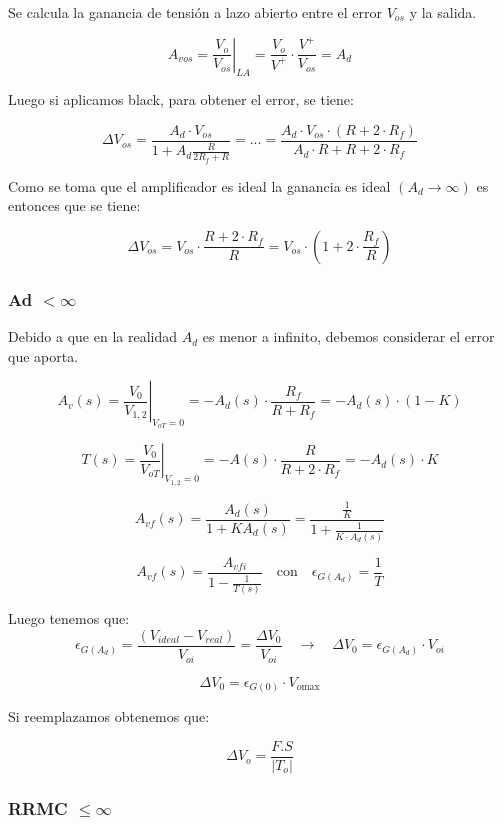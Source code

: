 Se calcula la ganancia de tensión a lazo abierto entre el error $V_{os}$ y la salida.

\[
A_{vos} = \left.\frac{V_{o}}{V_{o s}}\right|_{LA} = 
\frac{V_{o}}{V^{+}} \cdot \frac{V^{+}}{V_{os}} = A_d
\]

Luego si aplicamos black, para obtener el error, se tiene:
 
\[
\Delta V_{os} = \frac{A_d \cdot V_{os}}{1+A_d \frac{R}{2 R_f+R}} = ... 
 = \frac{A_d \cdot V_{os} \cdot (R + 2 \cdot R_f)}{A_d \cdot R + R + 2 \cdot R_f}
\]
 

Como se toma que el amplificador es ideal la ganancia es ideal $\left(A_{d} \rightarrow \infty\right)$ es entonces que se tiene:

\[
\Delta V_{os}  = V_{os} \cdot \frac {R + 2 \cdot R_f}{R} 
=  V_{os} \cdot (1 + 2 \cdot \frac {R_f}{R} )
\]
 
\subsubsection{Ad $ <  \infty $}

Debido a que en la realidad $A_d$ es menor a infinito, debemos considerar el error que aporta.

\[ A_v(s) = \left.\frac{V_0}{V_{1,2}}\right|_{V_{oT} = 0}  = -A_d(s) \cdot \frac{R_f}{R + R_f} = -A_d(s) \cdot (1 - K) \]

\[ T(s) = \left.\frac{V_0}{V_{oT}}\right|_{V_{1,2} = 0} = -A(s) \cdot  \frac{R}{R + 2\cdot R_f}= - A_d(s) \cdot K \]

\[ A_{vf}(s) = \frac{A_d(s)}{1 + K A_d(s)} = \frac{ \frac{1}{K} }{1+\frac{1}{K\cdot A_d(s)}}  \]

\[A_{vf}(s) = \frac{A_{vfi}}{1 - \frac{1}{T(s)}}  \quad  \text{con}  \quad  \epsilon_{G(A_d)} = \frac{1}{T} \]


Luego tenemos que:
\[
\epsilon_{G(A_d)} = \frac{(V_{ideal} - V_{real})}{V_{oi}} = \frac{\Delta V_0}{V_{oi}} \quad \rightarrow \quad \Delta V_0 = \epsilon_{G(A_d)} \cdot V_{oi}  
\]



\[
\Delta V_0 = \epsilon_{G(0)} \cdot V_{o\text{max}} 
\]

Si reemplazamos obtenemos que:

$$
\Delta V_{o}=\frac{F.S}{\left|T_{o}\right|}
$$


\subsubsection{RRMC $\le \infty$}

